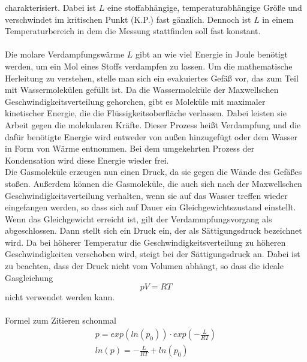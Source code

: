charakterisiert. Dabei ist $L$ eine stoffabhängige, temperaturabhängige Größe und verschwindet im kritischen Punkt (K.P.) fast gänzlich. Dennoch ist $L$ in einem Temperaturbereich 
in dem die Messung stattfinden soll fast konstant.\\
\\
Die molare Verdampfungswärme $L$ gibt an wie viel Energie in Joule benötigt werden, um ein Mol eines Stoffs verdampfen zu lassen. Um die mathematische Herleitung zu verstehen, stelle
man sich ein evakuiertes Gefäß vor, das zum Teil mit Wassermolekülen gefüllt ist. Da die Wassermoleküle der Maxwellschen Geschwindigkeitsverteilung gehorchen, gibt es Moleküle
mit maximaler kinetischer Energie, die die Flüssigkeitsoberfläche verlassen. Dabei leisten sie Arbeit gegen die molekularen Kräfte. Dieser Prozess
heißt Verdampfung und die dafür benötigte Energie wird entweder von außen hinzugefügt oder dem Wasser in Form von Wärme entnommen. Bei dem umgekehrten Prozess der Kondensation wird
diese Energie wieder frei.\\
Die Gasmoleküle erzeugen nun einen Druck, da sie gegen die Wände des Gefäßes stoßen. Außerdem können die Gasmoleküle, die auch sich nach der Maxwellschen
Geschwindigkeitsverteilung verhalten, wenn sie auf das Wasser treffen wieder eingefangen werden, so dass sich auf Dauer ein Gleichgewichtszustand einstellt. 
Wenn das Gleichgewicht erreicht ist, gilt der Verdammpfungsvorgang als abgeschlossen. Dann stellt sich ein Druck ein, der als Sättigungsdruck bezeichnet wird.
Da bei höherer Temperatur die Geschwindigkeitsverteilung zu höheren Geschwindigkeiten verschoben wird, steigt bei der Sättigungsdruck an. Dabei ist zu beachten, dass der Druck nicht
vom Volumen abhängt, so dass die ideale Gasgleichung
\begin{equation}
    \label{eqn:allgGasgl}
    pV = RT
\end{equation}
nicht verwendet werden kann.
\\
\\
Formel zum Zitieren schonmal
\begin{align}
    \label{eqn:druck}
    p = exp(ln(p_0))\cdot exp(-\frac{L}{RT}) \\
    ln(p) = -\frac{L}{RT} + ln(p_0)
\end{align}

\cite{sample}
